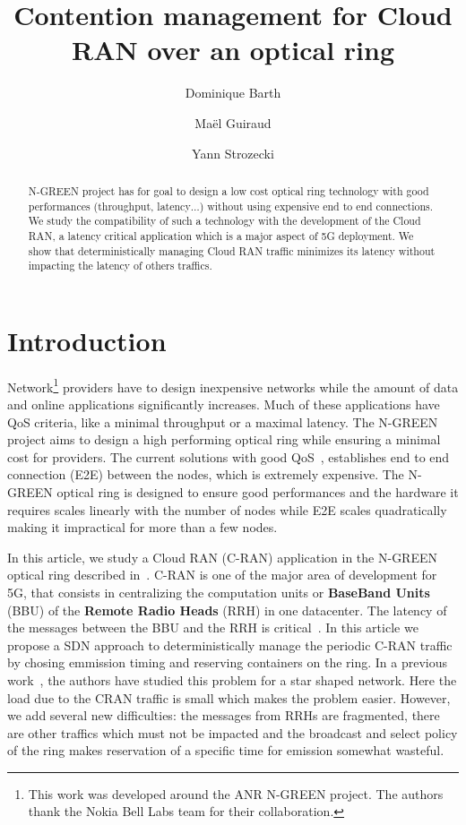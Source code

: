 \documentclass[]{algotel}
\title{Contention management for Cloud RAN over an optical ring}
\author{Dominique Barth\addressmark{1}
  \and Ma\"el Guiraud\addressmark{1}
   \and Yann Strozecki\addressmark{1}
  }
\begin{document}
\maketitle


\begin{abstract}
N-GREEN project has for goal to design a low cost optical ring technology with good performances (throughput, latency$\dots$) without using expensive end to end connections. We study the compatibility of such a technology with the development of the Cloud RAN, a latency critical application which is a major aspect of 5G deployment. We show that deterministically managing Cloud RAN traffic minimizes its latency without impacting the latency of others traffics. 
\end{abstract}


\section{Introduction}

Network\footnote{ This work was developed around the ANR N-GREEN project. The authors thank the Nokia Bell Labs team for their collaboration.} providers have to design inexpensive networks while the amount of data and online applications significantly increases. Much of these applications have QoS criteria, like a minimal throughput or a maximal latency. The N-GREEN project aims to design a high performing optical ring while ensuring a minimal cost for providers. The current solutions with good QoS~\cite{pizzinat2015things}, establishes end to end connection (E2E) between the nodes, which is extremely expensive. The N-GREEN optical ring is designed to ensure good performances and the hardware it requires scales linearly with the number of nodes while E2E scales quadratically making it impractical for more than a few nodes.

In this article, we study a Cloud RAN (C-RAN) application in the N-GREEN optical ring described in~\cite{ngreenarchitecture}. C-RAN is one of the major area of development for 5G, that consists in centralizing the computation units or {\bf BaseBand Units} (BBU) of the {\bf Remote Radio Heads} (RRH) in one datacenter. The latency of the messages between the BBU and the RRH is critical~\cite{bouguen2012lte,3gpp5g}. In this article we propose a SDN approach to deterministically manage the periodic C-RAN traffic by chosing emmission timing and reserving containers on the ring. In a previous work~\cite{dominique2018deterministic}, the authors have studied this problem for a star shaped network. Here the load due to the CRAN traffic is small which makes the problem easier. However, we add several new difficulties: the messages from RRHs are fragmented, there are other traffics which must not be impacted and the broadcast and select policy of the ring makes reservation of a specific time for emission somewhat wasteful. 
\end{document}
